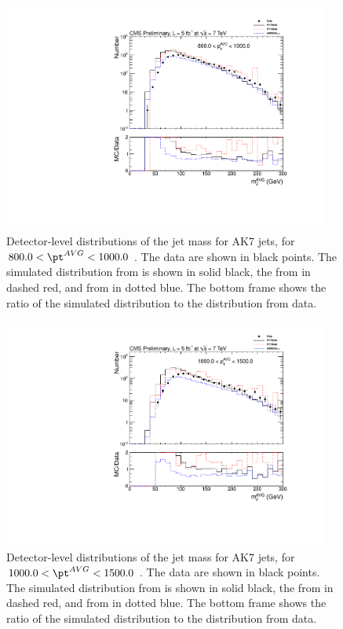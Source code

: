 \begin{figure}[htbp]
\centering
\includegraphics[width=0.95\textwidth]{figs/histAK7MjetVsPtAvg_rawDataMCComparisons_pt_9}
\caption{Detector-level distributions of the jet mass for AK7 jets,
for $800.0 < \pt^{AVG} < 1000.0$ \GeVc. The data are shown in black points.
The simulated distribution from \PYTHIA is shown in solid black, 
the from \PYTHIAEIGHT in dashed red, and from \HERWIG in dotted blue. 
The bottom frame shows the ratio of the simulated distribution
to the distribution from data. 
\label{figs:histAK7MjetVsPtAvg_rawDataMCComparisons_pt_9}}
\end{figure}



\begin{figure}[htbp]
\centering
\includegraphics[width=0.95\textwidth]{figs/histAK7MjetVsPtAvg_rawDataMCComparisons_pt_10}
\caption{Detector-level distributions of the jet mass for AK7 jets,
for $1000.0 < \pt^{AVG} < 1500.0$ \GeVc. The data are shown in black points.
The simulated distribution from \PYTHIA is shown in solid black, 
the from \PYTHIAEIGHT in dashed red, and from \HERWIG in dotted blue. 
The bottom frame shows the ratio of the simulated distribution
to the distribution from data. 
\label{figs:histAK7MjetVsPtAvg_rawDataMCComparisons_pt_10}}
\end{figure}


